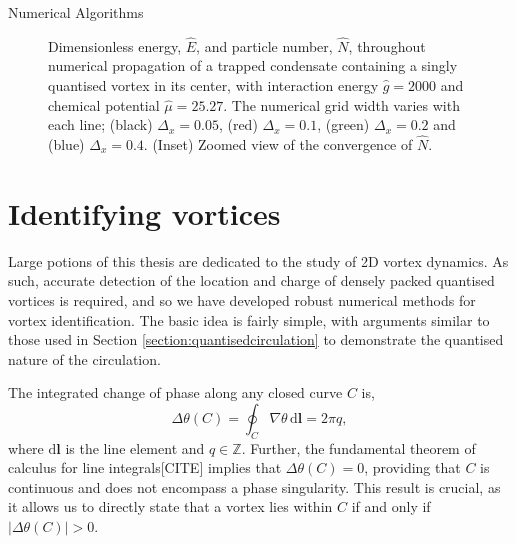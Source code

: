 \begin{chapter}{\label{cha:numerics}Numerical Algorithms}
\begin{figure}
  \caption{Dimensionless energy, $\hat{E}$, and particle number, $\hat{N}$, throughout numerical propagation of a trapped condensate containing a singly quantised vortex in its center, with interaction energy $\hat{g}=2000$ and chemical potential $\hat{\mu}=25.27$. The numerical grid width varies with each line; (black) $\Delta_x = 0.05$, (red) $\Delta_x = 0.1$, (green) $\Delta_x = 0.2$ and (blue) $\Delta_x = 0.4$. (Inset) Zoomed view of the convergence of $\hat{N}$.}\label{fig_energ_norm_cons}
 \end{figure}

\section{\label{section:vortexidentifying} Identifying vortices}
Large potions of this thesis are dedicated to the study of 2D vortex dynamics. As such, accurate detection of the location and charge of densely packed quantised vortices is required, and so we have developed robust numerical methods for vortex identification. The basic idea is fairly simple, with arguments similar to those used in Section \ref{section:quantisedcirculation} to demonstrate the quantised nature of the circulation.

The integrated change of phase along any closed curve $C$ is,
\begin{equation}
  \Delta\theta(C) = \oint_C \! \nabla \theta  \, \mathrm{d}\mathbf{l} = 2\pi q,
\end{equation}
where $\mathrm{d}\mathbf{l}$ is the line element and $q\in\mathbb{Z}$. Further, the fundamental theorem of calculus for line integrals[CITE] implies that $\Delta\theta(C) = 0$, providing that $C$ is continuous and does not encompass a phase singularity. This result is crucial, as it allows us to directly state that a vortex lies within $C$ if and only if $|\Delta\theta(C)| > 0 $.


\end{chapter}
